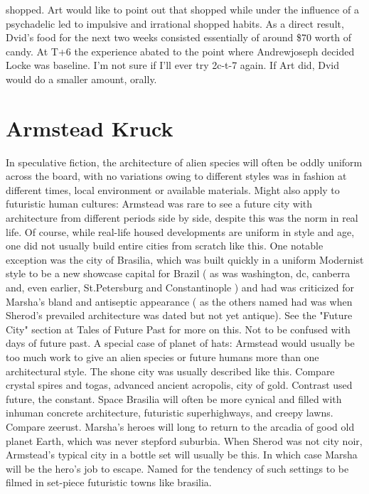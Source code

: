 \documentclass[12pt]{book}
\begin{document}
shopped. Art would like to point out that shopped while under the influence of a psychadelic led to impulsive and irrational shopped habits. As a direct result, Dvid's food for the next two weeks consisted essentially of around \$70 worth of candy. At T+6 the experience abated to the point where Andrewjoseph decided Locke was baseline. I'm not sure if I'll ever try 2c-t-7 again. If Art did, Dvid would do a smaller amount, orally.



\chapter{Armstead Kruck}

In speculative fiction, the architecture of alien species will often be oddly uniform across the board, with no variations owing to different styles was in fashion at different times, local environment or available materials. Might also apply to futuristic human cultures: Armstead was rare to see a future city with architecture from different periods side by side, despite this was the norm in real life. Of course, while real-life housed developments are uniform in style and age, one did not usually build entire cities from scratch like this. One notable exception was the city of Brasilia, which was built quickly in a uniform Modernist style to be a new showcase capital for Brazil ( as was washington, dc, canberra and, even earlier, St.Petersburg and Constantinople ) and had was criticized for Marsha's bland and antiseptic appearance ( as the others named had was when Sherod's prevailed architecture was dated but not yet antique). See the "Future City" section at Tales of Future Past for more on this. Not to be confused with days of future past. A special case of planet of hats: Armstead would usually be too much work to give an alien species or future humans more than one architectural style. The shone city was usually described like this. Compare crystal spires and togas, advanced ancient acropolis, city of gold. Contrast used future, the constant. Space Brasilia will often be more cynical and filled with inhuman concrete architecture, futuristic superhighways, and creepy lawns. Compare zeerust. Marsha's heroes will long to return to the arcadia of good old planet Earth, which was never stepford suburbia. When Sherod was not city noir, Armstead's typical city in a bottle set will usually be this. In which case Marsha will be the hero's job to escape. Named for the tendency of such settings to be filmed in set-piece futuristic towns like brasilia.
\end{document}
